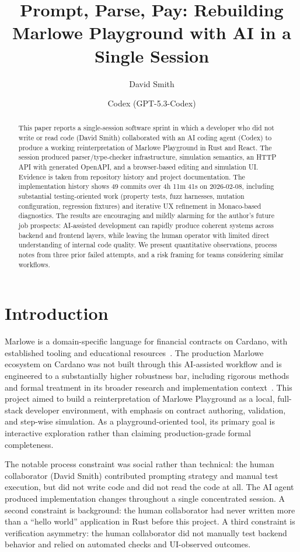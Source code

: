 \documentclass[11pt]{article}
\title{Prompt, Parse, Pay: Rebuilding Marlowe Playground with AI in a Single Session}
\author{David Smith \and Codex (GPT-5.3-Codex)}
\date{}
\begin{document}
\maketitle

\begin{abstract}
This paper reports a single-session software sprint in which a developer who did not write or read code (David Smith) collaborated with an AI coding agent (Codex) to produce a working reinterpretation of Marlowe Playground in Rust and React. The session produced parser/type-checker infrastructure, simulation semantics, an HTTP API with generated OpenAPI, and a browser-based editing and simulation UI. Evidence is taken from repository history and project documentation. The implementation history shows 49 commits over 4h 11m 41s on 2026-02-08, including substantial testing-oriented work (property tests, fuzz harnesses, mutation configuration, regression fixtures) and iterative UX refinement in Monaco-based diagnostics. The results are encouraging and mildly alarming for the author's future job prospects: AI-assisted development can rapidly produce coherent systems across backend and frontend layers, while leaving the human operator with limited direct understanding of internal code quality. We present quantitative observations, process notes from three prior failed attempts, and a risk framing for teams considering similar workflows.
\end{abstract}

\section{Introduction}
Marlowe is a domain-specific language for financial contracts on Cardano, with established tooling and educational resources~\cite{cardano-marlowe,marlowe-cardano}. The production Marlowe ecosystem on Cardano was not built through this AI-assisted workflow and is engineered to a substantially higher robustness bar, including rigorous methods and formal treatment in its broader research and implementation context~\cite{cardano-marlowe,marlowe-cardano}. This project aimed to build a reinterpretation of Marlowe Playground as a local, full-stack developer environment, with emphasis on contract authoring, validation, and step-wise simulation. As a playground-oriented tool, its primary goal is interactive exploration rather than claiming production-grade formal completeness.

The notable process constraint was social rather than technical: the human collaborator (David Smith) contributed prompting strategy and manual test execution, but did not write code and did not read the code at all. The AI agent produced implementation changes throughout a single concentrated session. A second constraint is background: the human collaborator had never written more than a ``hello world'' application in Rust before this project. A third constraint is verification asymmetry: the human collaborator did not manually test backend behavior and relied on automated checks and UI-observed outcomes.
\end{document}
